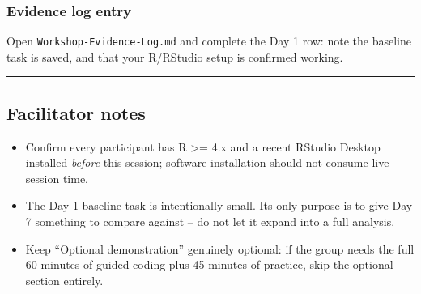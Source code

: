 \documentclass[11pt]{article}
\providecommand{\tightlist}{%
  \setlength{\itemsep}{0pt}\setlength{\parskip}{0pt}}
\begin{document}
\hypertarget{evidence-log-entry}{%
\subsubsection{Evidence log entry}\label{evidence-log-entry}}

Open \texttt{Workshop-Evidence-Log.md} and complete the Day 1 row: note
the baseline task is saved, and that your R/RStudio setup is confirmed
working.

\begin{center}\rule{0.5\linewidth}{0.5pt}\end{center}

\hypertarget{facilitator-notes}{%
\subsection{Facilitator notes}\label{facilitator-notes}}

\begin{itemize}
\tightlist
\item
  Confirm every participant has R \textgreater= 4.x and a recent RStudio
  Desktop installed \emph{before} this session; software installation
  should not consume live-session time.
\item
  The Day 1 baseline task is intentionally small. Its only purpose is to
  give Day 7 something to compare against -- do not let it expand into a
  full analysis.
\item
  Keep ``Optional demonstration'' genuinely optional: if the group needs
  the full 60 minutes of guided coding plus 45 minutes of practice, skip
  the optional section entirely.
\end{itemize}
\end{document}
